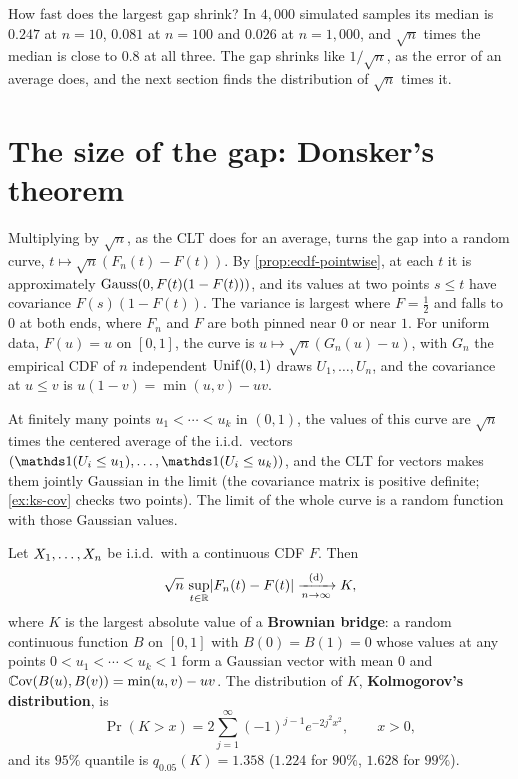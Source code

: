 How fast does the largest gap shrink?
In $4{,}000$ simulated samples its median is $0.247$ at $n = 10$, $0.081$ at $n = 100$ and $0.026$ at $n = 1{,}000$, and $\sqrt{n}$ times the median is close to $0.8$ at all three.
The gap shrinks like $1/\sqrt{n}$, as the error of an average does, and the next section finds the distribution of $\sqrt{n}$ times it.

\section{The size of the gap: Donsker's theorem}
\label{sec:ks-donsker}

Multiplying by $\sqrt{n}$, as the CLT does for an average, turns the gap into a random curve, $t \mapsto \sqrt{n}(F_n(t) - F(t))$.
By \cref{prop:ecdf-pointwise}, at each $t$ it is approximately $\text{Gauss}(0, F(t)(1 - F(t)))$, and its values at two points $s \leq t$ have covariance $F(s)(1 - F(t))$.
The variance is largest where $F = \frac12$ and falls to $0$ at both ends, where $F_n$ and $F$ are both pinned near $0$ or near $1$.
For uniform data, $F(u) = u$ on $[0, 1]$, the curve is $u \mapsto \sqrt{n}(G_n(u) - u)$, with $G_n$ the empirical CDF of $n$ independent $\mathrm{Unif}(0, 1)$ draws $U_1, \ldots, U_n$, and the covariance at $u \leq v$ is $u(1 - v) = \min(u, v) - uv$.


At finitely many points $u_1 < \cdots < u_k$ in $(0, 1)$, the values of this curve are $\sqrt{n}$ times the centered average of the i.i.d.\ vectors $(\ind(U_i \leq u_1), \ldots, \ind(U_i \leq u_k))$, and the CLT for vectors makes them jointly Gaussian in the limit (the covariance matrix is positive definite; \cref{ex:ks-cov} checks two points).
The limit of the whole curve is a random function with those Gaussian values.

\begin{theorem}
\label{thm:donsker}
Let $X_1, \ldots, X_n$ be i.i.d.\ with a continuous CDF $F$. Then
\[
\sqrt{n}\,\sup_{t \in \mathbb{R}}\lvert F_n(t) - F(t)\rvert \xrightarrow [n \to \infty ]{\text{(d)}} K,
\]
where $K$ is the largest absolute value of a \textbf{Brownian bridge}: a random continuous function $B$ on $[0, 1]$ with $B(0) = B(1) = 0$ whose values at any points $0 < u_1 < \cdots < u_k < 1$ form a Gaussian vector with mean $0$ and $\operatorname*{\mathbb{C}\text{ov}}(B(u), B(v)) = \min(u, v) - uv$. The distribution of $K$, \textbf{Kolmogorov's distribution}, is
\[
\Pr(K > x) = 2\sum_{j=1}^\infty (-1)^{j-1}e^{-2j^2x^2}, \qquad x > 0,
\]
and its $95\%$ quantile is $q_{0.05}(K) = 1.358$ ($1.224$ for $90\%$, $1.628$ for $99\%$).
\end{theorem}

